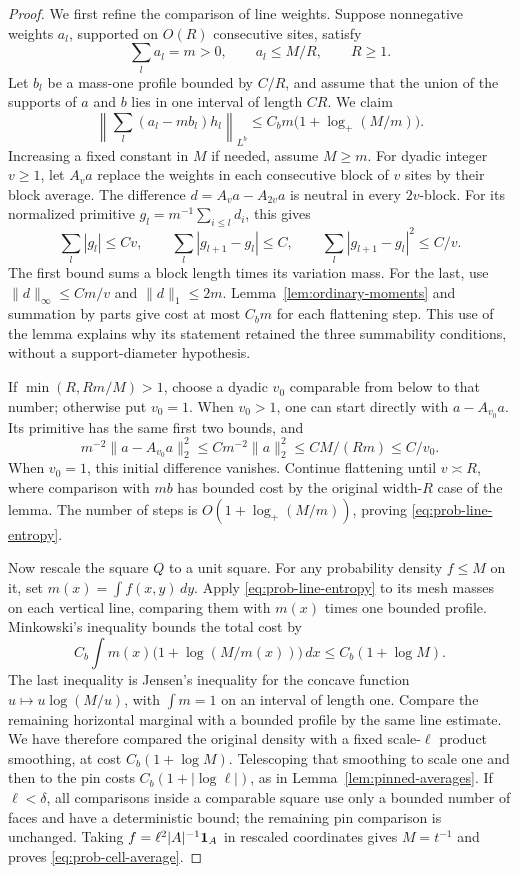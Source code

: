 \begin{proof}
We first refine the comparison of line weights. Suppose nonnegative
weights \(a_l\), supported on \(O(R)\) consecutive sites, satisfy
\[
 \sum_l a_l=m>0,\qquad a_l\le M/R,\qquad R\ge1.
\]
Let \(b_l\) be a mass-one profile bounded by \(C/R\), and assume that
the union of the supports of \(a\) and \(b\) lies in one interval of
length \(CR\). We claim
\begin{equation}\label{eq:prob-line-entropy}
 \left\|\sum_l(a_l-mb_l)h_l\right\|_{L^b}
 \le C_bm\bigl(1+\log_+(M/m)\bigr).
\end{equation}
Increasing a fixed constant in \(M\) if needed, assume \(M\ge m\).
For dyadic integer \(v\ge1\), let \(A_va\) replace the weights in
each consecutive block of \(v\) sites by their block average.
The difference \(d=A_va-A_{2v}a\) is neutral in every \(2v\)-block.
For its normalized primitive \(g_l=m^{-1}\sum_{i\le l}d_i\), this gives
\[
 \sum_l|g_l|\le Cv,\qquad
 \sum_l|g_{l+1}-g_l|\le C,\qquad
 \sum_l|g_{l+1}-g_l|^2\le C/v.
\]
The first bound sums a block length times its variation mass.
For the last, use \(\|d\|_\infty\le Cm/v\) and
\(\|d\|_1\le2m\). Lemma~\ref{lem:ordinary-moments} and summation by
parts give cost at most \(C_bm\) for each flattening step. This use of
the lemma explains why its statement retained the three summability
conditions, without a support-diameter hypothesis.

If \(\min(R,Rm/M)>1\), choose a dyadic \(v_0\) comparable from below
to that number; otherwise put \(v_0=1\).
When \(v_0>1\), one can start directly with \(a-A_{v_0}a\).
Its primitive has the same first two bounds, and
\[
 m^{-2}\|a-A_{v_0}a\|_2^2
 \le C m^{-2}\|a\|_2^2
 \le CM/(Rm)\le C/v_0.
\]
When \(v_0=1\), this initial difference vanishes. Continue flattening
until \(v\asymp R\), where comparison with \(mb\) has bounded cost
by the original width-\(R\) case of the lemma. The number of steps is
\(O(1+\log_+(M/m))\), proving \eqref{eq:prob-line-entropy}.

Now rescale the square \(Q\) to a unit square. For any probability
density \(f\le M\) on it, set \(m(x)=\int f(x,y)\,dy\).
Apply \eqref{eq:prob-line-entropy} to its mesh masses on each vertical
line, comparing them with \(m(x)\) times one bounded profile.
Minkowski's inequality bounds the total cost by
\[
 C_b\int m(x)\bigl(1+\log(M/m(x))\bigr)\,dx
 \le C_b(1+\log M).
\]
The last inequality is Jensen's inequality for the concave function
\(u\mapsto u\log(M/u)\), with \(\int m=1\) on an interval of length
one. Compare the remaining horizontal marginal with a bounded profile
by the same line estimate. We have therefore compared the original
density with a fixed scale-\(\ell\) product smoothing, at cost
\(C_b(1+\log M)\). Telescoping that smoothing to scale one and then
to the pin costs \(C_b(1+|\log\ell|)\), as in
Lemma~\ref{lem:pinned-averages}.
If \(\ell<\delta\), all comparisons inside a comparable square use
only a bounded number of faces and have a deterministic bound; the
remaining pin comparison is unchanged. Taking
\(f=\ell^2|A|^{-1}\mathbf1_A\) in rescaled coordinates gives
\(M=t^{-1}\) and proves \eqref{eq:prob-cell-average}.
\end{proof}

